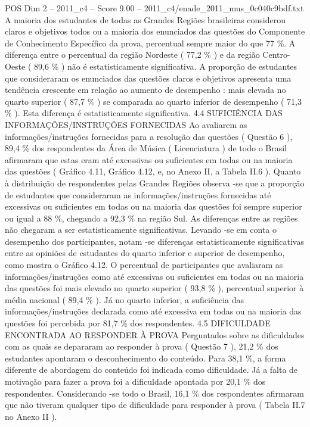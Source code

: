 \begin{textsample}{POS Dim 2 – 2011\_c4 – Score 9.00 – 2011\_c4/enade\_2011\_mus\_0c040c9bdf.txt}
A maioria dos estudantes de todas as Grandes Regiões brasileiras considerou claros e objetivos todos ou a maioria dos enunciados das questões do Componente de Conhecimento Específico da prova, percentual sempre maior do que 77 \%.
A diferença entre o percentual da região Nordeste ( 77,2 \% ) e da região Centro-Oeste ( 89,6 \% ) não é estatisticamente significativa.
A proporção de estudantes que consideraram os enunciados das questões claros e objetivos apresenta uma tendência crescente em relação ao aumento de desempenho : mais elevada no quarto superior ( 87,7 \% ) se comparada ao quarto inferior de desempenho ( 71,3 \% ).
Esta diferença é estatisticamente significativa. 4.4 SUFICIÊNCIA DAS INFORMAÇÕES/INSTRUÇÕES FORNECIDAS Ao avaliarem as informações/instruções fornecidas para a resolução das questões ( Questão 6 ), 89,4 \% dos respondentes da Área de Música ( Licenciatura ) de todo o Brasil afirmaram que estas eram até excessivas ou suficientes em todas ou na maioria das questões ( Gráfico 4.11, Gráfico 4.12, e, no Anexo II, a Tabela II.6 ).
Quanto à distribuição de respondentes pelas Grandes Regiões observa -se que a proporção de estudantes que consideraram as informações/instruções fornecidas até excessivas ou suficientes em todas ou na maioria das questões foi sempre superior ou igual a 88 \%, chegando a 92,3 \% na região Sul.
As diferenças entre as regiões não chegaram a ser estatisticamente significativas.
Levando -se em conta o desempenho dos participantes, notam -se diferenças estatisticamente significativas entre as opiniões de estudantes do quarto inferior e superior de desempenho, como mostra o Gráfico 4.12.
O percentual de participantes que avaliaram as informações/instruções como até excessivas ou suficientes em todas ou na maioria das questões foi mais elevado no quarto superior ( 93,8 \% ), percentual superior à média nacional ( 89,4 \% ).
Já no quarto inferior, a suficiência das informações/instruções declarada como até excessiva em todas ou na maioria das questões foi percebida por 81,7 \% dos respondentes. 4.5 DIFICULDADE ENCONTRADA AO RESPONDER À PROVA Perguntados sobre as dificuldades com as quais se depararam ao responder à prova ( Questão 7 ), 21,2 \% dos estudantes apontaram o desconhecimento do conteúdo.
Para 38,1 \%, a forma diferente de abordagem do conteúdo foi indicada como dificuldade.
Já a falta de motivação para fazer a prova foi a dificuldade apontada por 20,1 \% dos respondentes.
Considerando -se todo o Brasil, 16,1 \% dos respondentes afirmaram que não tiveram qualquer tipo de dificuldade para responder à prova ( Tabela II.7 no Anexo II ).

\end{textsample}
